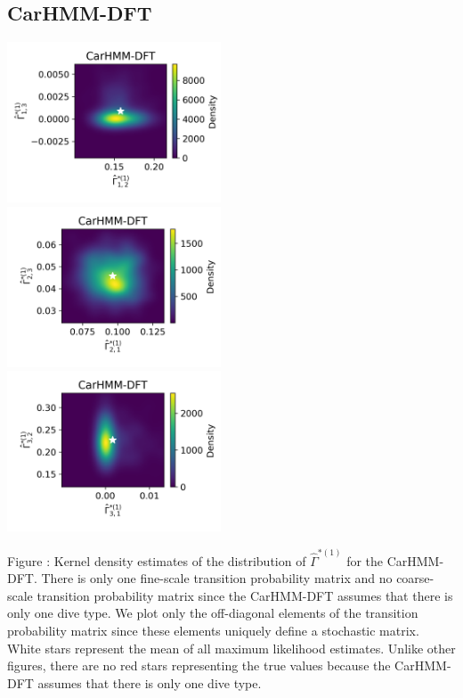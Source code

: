 \documentclass{article}
\begin{document}
        \subsection{CarHMM-DFT}
        \begin{center}
        \includegraphics[width=2.5in]{../Plots/hmm_FV_Gamma_density_0_row_0.png} \\
        \includegraphics[width=2.5in]{../Plots/hmm_FV_Gamma_density_0_row_1.png} \\
        \includegraphics[width=2.5in]{../Plots/hmm_FV_Gamma_density_0_row_2.png} \\
        \end{center}
        
        \noindent Figure : Kernel density estimates of the distribution of $\hat \Gamma^{*(1)}$ for the CarHMM-DFT. There is only one fine-scale transition probability matrix and no coarse-scale transition probability matrix since the CarHMM-DFT assumes that there is only one dive type. We plot only the off-diagonal elements of the transition probability matrix since these elements uniquely define a stochastic matrix. White stars represent the mean of all maximum likelihood estimates. Unlike other figures, there are no red stars representing the true values because the CarHMM-DFT assumes that there is only one dive type.
        \addtocounter{fignum}{1}
\end{document}
